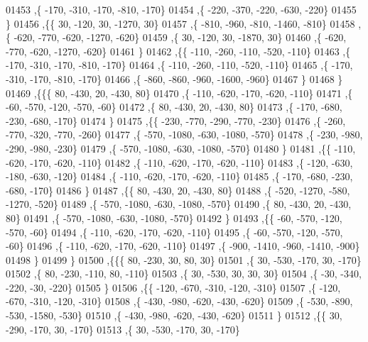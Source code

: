 \begin{DoxyCode}
01453     ,\{  -170,  -310,  -170,  -810,  -170\}
01454     ,\{  -220,  -370,  -220,  -630,  -220\}
01455     \}
01456    ,\{\{    30,  -120,    30, -1270,    30\}
01457     ,\{  -810,  -960,  -810, -1460,  -810\}
01458     ,\{  -620,  -770,  -620, -1270,  -620\}
01459     ,\{    30,  -120,    30, -1870,    30\}
01460     ,\{  -620,  -770,  -620, -1270,  -620\}
01461     \}
01462    ,\{\{  -110,  -260,  -110,  -520,  -110\}
01463     ,\{  -170,  -310,  -170,  -810,  -170\}
01464     ,\{  -110,  -260,  -110,  -520,  -110\}
01465     ,\{  -170,  -310,  -170,  -810,  -170\}
01466     ,\{  -860,  -860,  -960, -1600,  -960\}
01467     \}
01468    \}
01469   ,\{\{\{    80,  -430,    20,  -430,    80\}
01470     ,\{  -110,  -620,  -170,  -620,  -110\}
01471     ,\{   -60,  -570,  -120,  -570,   -60\}
01472     ,\{    80,  -430,    20,  -430,    80\}
01473     ,\{  -170,  -680,  -230,  -680,  -170\}
01474     \}
01475    ,\{\{  -230,  -770,  -290,  -770,  -230\}
01476     ,\{  -260,  -770,  -320,  -770,  -260\}
01477     ,\{  -570, -1080,  -630, -1080,  -570\}
01478     ,\{  -230,  -980,  -290,  -980,  -230\}
01479     ,\{  -570, -1080,  -630, -1080,  -570\}
01480     \}
01481    ,\{\{  -110,  -620,  -170,  -620,  -110\}
01482     ,\{  -110,  -620,  -170,  -620,  -110\}
01483     ,\{  -120,  -630,  -180,  -630,  -120\}
01484     ,\{  -110,  -620,  -170,  -620,  -110\}
01485     ,\{  -170,  -680,  -230,  -680,  -170\}
01486     \}
01487    ,\{\{    80,  -430,    20,  -430,    80\}
01488     ,\{  -520, -1270,  -580, -1270,  -520\}
01489     ,\{  -570, -1080,  -630, -1080,  -570\}
01490     ,\{    80,  -430,    20,  -430,    80\}
01491     ,\{  -570, -1080,  -630, -1080,  -570\}
01492     \}
01493    ,\{\{   -60,  -570,  -120,  -570,   -60\}
01494     ,\{  -110,  -620,  -170,  -620,  -110\}
01495     ,\{   -60,  -570,  -120,  -570,   -60\}
01496     ,\{  -110,  -620,  -170,  -620,  -110\}
01497     ,\{  -900, -1410,  -960, -1410,  -900\}
01498     \}
01499    \}
01500   ,\{\{\{    80,  -230,    30,    80,    30\}
01501     ,\{    30,  -530,  -170,    30,  -170\}
01502     ,\{    80,  -230,  -110,    80,  -110\}
01503     ,\{    30,  -530,    30,    30,    30\}
01504     ,\{   -30,  -340,  -220,   -30,  -220\}
01505     \}
01506    ,\{\{  -120,  -670,  -310,  -120,  -310\}
01507     ,\{  -120,  -670,  -310,  -120,  -310\}
01508     ,\{  -430,  -980,  -620,  -430,  -620\}
01509     ,\{  -530,  -890,  -530, -1580,  -530\}
01510     ,\{  -430,  -980,  -620,  -430,  -620\}
01511     \}
01512    ,\{\{    30,  -290,  -170,    30,  -170\}
01513     ,\{    30,  -530,  -170,    30,  -170\}

\end{DoxyCode}
